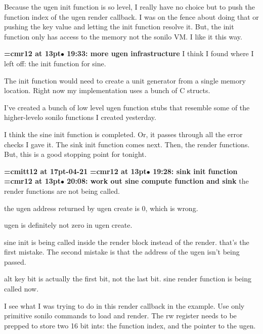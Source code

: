 Because the ugen init function is so level, I really have no choice but to push the function index of the ugen render  callback. I was on the fence about doing that or pushing the key value and letting the init function resolve it. But, the init function only has access to the memory not the sonilo VM. I like it this way.
\par

{\smallskip\noindent\bf\font\titlefont=cmr12 at 13pt\titlefont $\bullet$ 19:33: more ugen infrastructure}\smallskip
I think I found where I left off: the init function for sine.
\par

The init function would need to create a unit generator from a single memory location. Right now my implementation uses a bunch of C structs.
\par

I've created a bunch of low level ugen function stubs that resemble some of the higher-levelo sonilo functions I created yesterday.
\par

I think the sine init function is completed. Or, it passes through all the error checks I gave it. The sink init function comes next. Then, the render functions. But, this is a good stopping point for tonight.
\par

{\medskip\noindent\bf\font\titlefont=cmitt12 at 17pt-04-21}\medskip
{\smallskip\noindent\bf\font\titlefont=cmr12 at 13pt\titlefont $\bullet$ 19:28: sink init function}\smallskip
{\smallskip\noindent\bf\font\titlefont=cmr12 at 13pt\titlefont $\bullet$ 20:08: work out sine compute function and sink}\smallskip
the render functions are not being called.
\par

the ugen address returned by ugen create is 0, which is wrong.
\par

ugen is definitely not zero in ugen create.
\par

sine init is being called inside the render block instead of the render. that's the first mistake. The second mistake is that the address of the ugen isn't being passed.
\par

alt key bit is actually the first bit, not the last bit. sine render function is being called now.
\par

I see what I was trying to do in this render callback in the example. Use only primitive sonilo commands to load and render. The rw register needs to be prepped to store two 16 bit ints: the function index, and the pointer to the ugen.
\par

